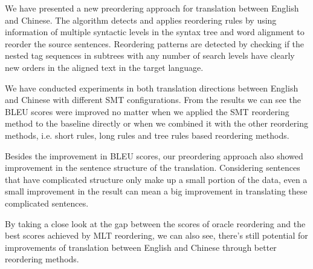 \documentclass[a4paper]{article}
\begin{document}
We have presented a new preordering approach for translation
between English and Chinese. The algorithm detects and applies reordering rules by using information of multiple syntactic levels in the syntax tree and word alignment to reorder the source sentences. Reordering patterns are detected by checking if the nested tag sequences in subtrees with any number of search levels have clearly new orders in the aligned text in the target language.

We have conducted experiments in both translation directions between English and Chinese with different SMT configurations. From the results we can see the BLEU scores were improved no matter when we applied the SMT reordering method to the baseline directly or when we combined it with the other reordering methods, i.e. short rules, long rules and tree rules based reordering methods.



Besides the improvement in BLEU scores, our preordering approach also showed improvement in the sentence structure of the translation. Considering sentences that have complicated structure only make up a small portion of the data, even a small improvement in the result can mean a big improvement in translating these complicated sentences.

By taking a close look at the gap between the scores of oracle reordering and the best scores achieved by MLT reordering, we can also see, there's still potential for improvements of translation between English and Chinese through better reordering methods.



\end{document}
